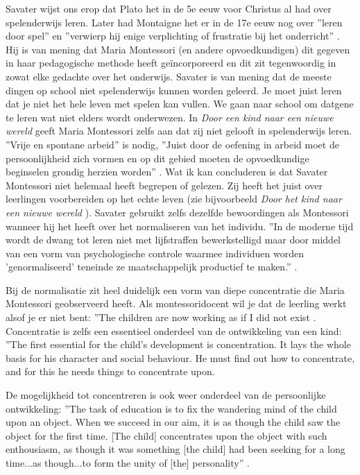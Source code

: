 \documentclass[12pt, a4paper]{article}
\begin{document}
Savater wijst ons erop dat Plato het in de 5e eeuw voor Christus al had over spelenderwijs leren. Later had Montaigne het er in de 17e eeuw nog over ''leren door spel'' en ''verwierp hij enige verplichting of frustratie bij het onderricht'' \cite[p.97]{savater}. Hij is van mening dat Maria Montessori (en andere opvoedkundigen) dit gegeven in haar pedagogische methode heeft geïncorporeerd en dit zit tegenwoordig in zowat elke gedachte over het onderwijs. Savater is van mening dat de meeste dingen op school niet spelenderwijs kunnen worden geleerd. Je moet juist leren dat je niet het hele leven met spelen kan vullen. We gaan naar school om datgene te leren wat niet elders wordt onderwezen. \cite[p.87-100]{savater}
In \emph{Door een kind naar een nieuwe wereld} geeft Maria Montessori zelfs aan dat zij niet gelooft in spelenderwijs leren. ''Vrije en spontane arbeid'' is nodig, ''Juist door de oefening in arbeid moet de persoonlijkheid zich vormen en op dit gebied moeten de opvoedkundige beginselen grondig herzien worden'' \cite[p.64]{Montessori1952}.
Wat ik kan concluderen is dat Savater Montessori niet helemaal heeft begrepen of gelezen. Zij heeft het juist over leerlingen voorbereiden op het echte leven (zie bijvoorbeeld \emph{Door het kind naar een nieuwe wereld} \cite[]{Montessori1954}). Savater gebruikt zelfs dezelfde bewoordingen als Montessori wanneer hij het heeft over het normaliseren van het individu. ''In de moderne tijd wordt de dwang tot leren niet met lijfstraffen bewerkstelligd maar door middel van een vorm van psychologische controle waarmee individuen worden 'genormaliseerd' teneinde ze maatschappelijk productief te maken.'' \cite[p.95]{savater}.

Bij de normalisatie zit heel duidelijk een vorm van diepe concentratie die Maria Montessori geobserveerd heeft. Als montessoridocent wil je dat de leerling werkt alsof je er niet bent: ''The children are now working as if I did not exist \cite[p.257]{Montessori2016}. Concentratie is zelfs een essentieel onderdeel van de ontwikkeling van een kind: ''The first essential for the child's development is concentration. It lays the whole basis for his character and social behaviour. He must find out how to concentrate, and for this he needs things to concentrate upon. \cite[p. 201]{Montessori2016}

De mogelijkheid tot concentreren is ook weer onderdeel van de persoonlijke ontwikkeling: ''The task of education is to fix the wandering mind of the child upon an object. When we succeed in our aim, it is as though the child saw the object for the first time. [The child] concentrates upon the object with such enthousiasm, as though it was something [the child] had been seeking for a long time...as though...to form the unity of [the] personality'' \cite[Montessori geciteerd, p.105]{Lillard}.
\end{document}
